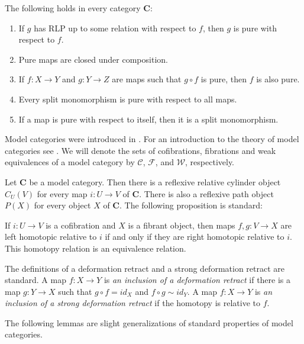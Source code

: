 \documentclass{tac}
\theoremstyle{definition}
\newcommand{\we}{\mathcal{W}}
\newcommand{\fib}{\mathcal{F}}
\newcommand{\cof}{\mathcal{C}}
\newcommand{\cat}[1]{\mathbf{#1}}
\newcommand{\C}{\cat{C}}
\begin{document}
\begin{prop} The following holds in every category $\C$:
\begin{enumerate}
\item If $g$ has RLP up to some relation with respect to $f$, then $g$ is pure with respect to $f$.
\item Pure maps are closed under composition.
\item If $f : X \to Y$ and $g : Y \to Z$ are maps such that $g \circ f$ is pure, then $f$ is also pure.
\item Every split monomorphism is pure with respect to all maps.
\item If a map is pure with respect to itself, then it is a split monomorphism.
\end{enumerate}
\end{prop}

Model categories were introduced in \cite{quillen}.
For an introduction to the theory of model categories see \cite{hirschhorn,hovey}.
We will denote the sets of cofibrations, fibrations and weak equivalences of a model category by $\cof$, $\fib$, and $\we$, respectively.

Let $\C$ be a model category.
Then there is a reflexive relative cylinder object $C_U(V)$ for every map $i : U \to V$ of $\C$.
There is also a reflexive path object $P(X)$ for every object $X$ of $\C$.
The following proposition is standard:
\begin{prop}
If $i : U \to V$ is a cofibration and $X$ is a fibrant object, then maps $f,g : V \to X$ are left homotopic relative to $i$ if and only if they are right homotopic relative to $i$.
This homotopy relation is an equivalence relation.
\end{prop}

The definitions of a deformation retract and a strong deformation retract are standard.
A map $f : X \to Y$ is \emph{an inclusion of a deformation retract} if there is
a map $g : Y \to X$ such that $g \circ f = id_X$ and $f \circ g \sim id_Y$.
A map $f : X \to Y$ is \emph{an inclusion of a strong deformation retract} if the homotopy is relative to $f$.

The following lemmas are slight generalizations of standard properties of model categories.
\end{document}
